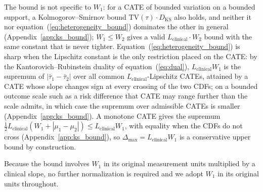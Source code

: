 \documentclass[AMA,Times1COL]{WileyNJDv5}
\begin{document}
The bound is not specific to $W_1$: for a CATE of bounded variation on a bounded support, a Kolmogorov--Smirnov bound $\mathrm{TV}(\tau) \cdot D_{\text{KS}}$ also holds, and neither it nor equation~(\ref{eq:heterogeneity_bound}) dominates the other in general (Appendix~\ref{app:ks_bound}); $W_1 \leq W_2$ gives a valid $L_{\text{clinical}} \cdot W_2$ bound with the same constant that is never tighter.\cite{villani2009} Equation~(\ref{eq:heterogeneity_bound}) is sharp when the Lipschitz constant is the only restriction placed on the CATE: by the Kantorovich--Rubinstein duality of equation~(\ref{eq:dual}), $L_{\text{clinical}} W_1$ is the supremum of $|\bar{\tau}_1 - \bar{\tau}_2|$ over all common $L_{\text{clinical}}$-Lipschitz CATEs, attained by a CATE whose slope changes sign at every crossing of the two CDFs; on a bounded outcome scale such as a risk difference that CATE may range further than the scale admits, in which case the supremum over admissible CATEs is smaller (Appendix~\ref{app:ks_bound}). A monotone CATE gives the supremum $\tfrac{1}{2} L_{\text{clinical}} (W_1 + |\mu_1 - \mu_2|) \leq L_{\text{clinical}} W_1$, with equality when the CDFs do not cross (Appendix~\ref{app:ks_bound}), so $\Delta_{\max} = L_{\text{clinical}} W_1$ is a conservative upper bound by construction.%

Because the bound involves $W_1$ in its original measurement units multiplied by a clinical slope, no further normalization is required and we adopt $W_1$ in its original units throughout.
\end{document}

